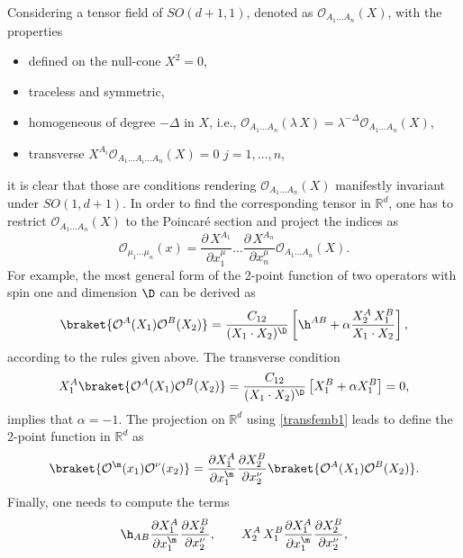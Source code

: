 \documentclass[a4paper,11pt,openright,twoside]{book}
\newcommand{\mO}{\mathcal{O}}
\let\a=\alpha   \let\b=\beta   \let\g=\gamma   \let\d=\delta
\let\n=\nu      \let\x=\xi     \let\p=\pi      \let\r=\rho
\numberwithin{equation}{section}
\begin{document}
Considering a tensor field of $SO(d+1,1)$, denoted as $\mathcal{O}_{A_1\dots A_n}(X)$, with the properties
\begin{itemize}
	\item defined on the null-cone $X^2=0$,
	\item traceless and symmetric,
	\item homogeneous of degree $-\Delta$ in $X$, i.e., $\mathcal{O}_{A_1\dots A_n}(\lambda\,X)=\lambda^{-\Delta} \mathcal{O}_{A_1\dots A_n}(X)$,
	\item transverse $X^{A_i}\mathcal{O}_{A_1\dots  A_{i}\dots A_n}(X)=0$ $j=1,\dots,n$,
\end{itemize}
it is clear that those are conditions rendering $\mathcal{O}_{A_1\dots A_n}(X)$ manifestly invariant under $SO(1,d+1)$. In order to find the corresponding tensor in $\mathbb{R}^d$, one has to restrict $\mathcal{O}_{A_1\dots A_n}(X)$ to the Poincar\'e section and project the indices as
\begin{equation}
	\mathcal{O}_{\mu_1\dots\mu_n}(x)=\frac{\partial\,X^{A_1}}{\partial x^\mu_1}\dots\frac{\partial\,X^{A_n}}{\partial x^\mu_n}\mathcal{O}_{A_1\dots A_n}(X).\label{transfemb1}
\end{equation}
For example, the most general form of the 2-point function of two operators with spin one and dimension $\D$ can be derived as
\begin{equation}
	\braket{\mO^A(X_1)\mO^B(X_2)}=\frac{C_{12}}{(X_1\cdot X_2)^\D}\left[\h^{AB}+\a\frac{X_2^A\,X_1^B}{X_1\cdot X_2}\right]\label{2pointemb},
\end{equation}
according to the rules given above. The transverse condition 
\begin{equation}
	X_1^A\braket{\mO^A(X_1)\mO^B(X_2)}=\frac{C_{12}}{(X_1\cdot X_2)^\D}\left[X_1^B+\a X_1^B\right]=0,
\end{equation}
implies that $\a=-1$. The projection on $\mathbb{R}^d$ using \eqref{transfemb1} leads to define the 2-point function in $\mathbb{R}^d$ as
\begin{equation}
	\braket{\mO^\m(x_1)\mO^\n(x_2)}=\frac{\partial X_1^A}{\partial x_1^\m}\frac{\partial X_2^B}{\partial x_2^\n}\braket{\mO^A(X_1)\mO^B(X_2)}.\label{transfemb}
\end{equation}
Finally, one needs to compute the terms
\begin{equation}
	\h_{AB}\frac{\partial X_1^A}{\partial x_1^\m}\frac{\partial X_2^B}{\partial x_2^\n},\qquad X_2^A\,X_1^B\frac{\partial X_1^A}{\partial x_1^\m}\frac{\partial X_2^B}{\partial x_2^\n},
\end{equation}
\end{document}
